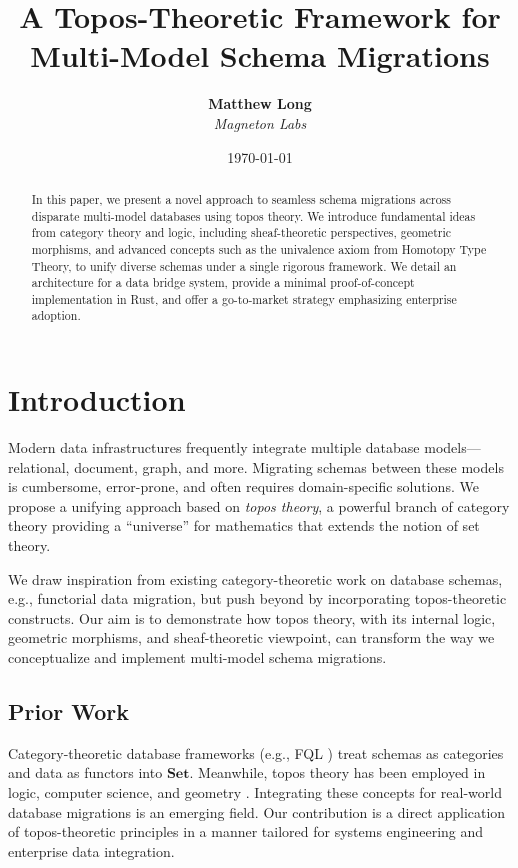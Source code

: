 \documentclass[11pt]{article}
\title{A Topos-Theoretic Framework for Multi-Model Schema Migrations}
\author{
  \textbf{Matthew Long}\\
  \textit{Magneton Labs}
}
\date{\today}
\begin{document}
\maketitle

\begin{abstract}
In this paper, we present a novel approach to seamless schema migrations across disparate multi-model databases using topos theory. We introduce fundamental ideas from category theory and logic, including sheaf-theoretic perspectives, geometric morphisms, and advanced concepts such as the univalence axiom from Homotopy Type Theory, to unify diverse schemas under a single rigorous framework. We detail an architecture for a data bridge system, provide a minimal proof-of-concept implementation in Rust, and offer a go-to-market strategy emphasizing enterprise adoption.
\end{abstract}

\section{Introduction}
Modern data infrastructures frequently integrate multiple database models---relational, document, graph, and more. Migrating schemas between these models is cumbersome, error-prone, and often requires domain-specific solutions. We propose a unifying approach based on \emph{topos theory}, a powerful branch of category theory providing a ``universe'' for mathematics that extends the notion of set theory.

We draw inspiration from existing category-theoretic work on database schemas, e.g., functorial data migration, but push beyond by incorporating topos-theoretic constructs. Our aim is to demonstrate how topos theory, with its internal logic, geometric morphisms, and sheaf-theoretic viewpoint, can transform the way we conceptualize and implement multi-model schema migrations.

\subsection{Prior Work}
Category-theoretic database frameworks (e.g., FQL \cite{SpivakFQL}) treat schemas as categories and data as functors into \(\mathbf{Set}\). Meanwhile, topos theory has been employed in logic, computer science, and geometry \cite{JohnstoneSketches}. Integrating these concepts for real-world database migrations is an emerging field. Our contribution is a direct application of topos-theoretic principles in a manner tailored for systems engineering and enterprise data integration.
\end{document}
